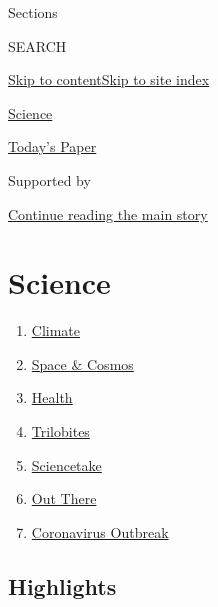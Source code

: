 Sections

SEARCH

\protect\hyperlink{site-content}{Skip to
content}\protect\hyperlink{site-index}{Skip to site index}

\href{https://www.nytimes.com/section/science}{Science}

\href{https://myaccount.nytimes.com/auth/login?response_type=cookie\&client_id=vi}{}

\href{https://www.nytimes.com/section/todayspaper}{Today's Paper}

Supported by

\protect\hyperlink{after-sponsor}{Continue reading the main story}

\hypertarget{science}{%
\section{Science}\label{science}}

\begin{enumerate}
\def\labelenumi{\arabic{enumi}.}
\tightlist
\item
  \href{/section/climate}{Climate}
\item
  \href{/section/science/space}{Space \& Cosmos}
\item
  \href{/section/health}{Health}
\item
  \href{/column/trilobites}{Trilobites}
\item
  \href{/column/sciencetake}{Sciencetake}
\item
  \href{/column/out-there}{Out There}
\item
  \href{/news-event/coronavirus}{Coronavirus Outbreak}
\end{enumerate}

\hypertarget{highlights}{%
\subsection{Highlights}\label{highlights}}

